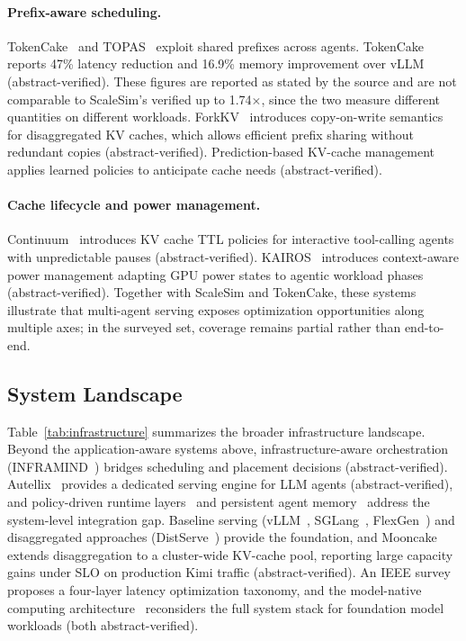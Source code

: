 \paragraph*{Prefix-aware scheduling.}
TokenCake~\cite{tokencake2025} and TOPAS~\cite{topas2026} exploit shared prefixes across agents. TokenCake reports 47\% latency reduction and 16.9\% memory improvement over vLLM (abstract-verified). These figures are reported as stated by the source and are not comparable to ScaleSim's verified up to 1.74$\times$, since the two measure different quantities on different workloads. ForkKV~\cite{forkkv2026} introduces copy-on-write semantics for disaggregated KV caches, which allows efficient prefix sharing without redundant copies (abstract-verified). Prediction-based KV-cache management~\cite{predkvcache2026} applies learned policies to anticipate cache needs (abstract-verified).

\paragraph*{Cache lifecycle and power management.}
Continuum~\cite{continuum2025} introduces KV cache TTL policies for interactive tool-calling agents with unpredictable pauses (abstract-verified). KAIROS~\cite{kairos2026} introduces context-aware power management adapting GPU power states to agentic workload phases (abstract-verified). Together with ScaleSim and TokenCake, these systems illustrate that multi-agent serving exposes optimization opportunities along multiple axes; in the surveyed set, coverage remains partial rather than end-to-end.

\subsection{System Landscape}\label{sec:infra_landscape}

Table~\ref{tab:infrastructure} summarizes the broader infrastructure landscape. Beyond the application-aware systems above, infrastructure-aware orchestration (INFRAMIND~\cite{inframind2026}) bridges scheduling and placement decisions (abstract-verified). Autellix~\cite{autellix2025} provides a dedicated serving engine for LLM agents (abstract-verified), and policy-driven runtime layers~\cite{policyruntime2026} and persistent agent memory~\cite{agentmemory2026} address the system-level integration gap. Baseline serving (vLLM~\cite{kwon2023}, SGLang~\cite{sglang2024}, FlexGen~\cite{flexgen2023}) and disaggregated approaches (DistServe~\cite{distserve2024}) provide the foundation, and Mooncake~\cite{mooncake2025} extends disaggregation to a cluster-wide KV-cache pool, reporting large capacity gains under SLO on production Kimi traffic (abstract-verified). An IEEE survey~\cite{latencysurvey2026} proposes a four-layer latency optimization taxonomy, and the model-native computing architecture~\cite{modelnative2026} reconsiders the full system stack for foundation model workloads (both abstract-verified).

